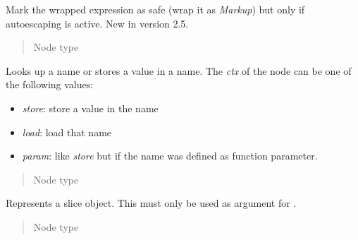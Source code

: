 \documentclass[a4paper,10pt,english]{sphinxmanual}
\begin{document}

\begin{fulllineitems}
\label{extensions:jinja2.nodes.MarkSafeIfAutoescape}
Mark the wrapped expression as safe (wrap it as \emph{Markup}) but
only if autoescaping is active.
New in version 2.5.\begin{quote}\begin{description}
\item[{Node type}] \leavevmode
{\hyperref[extensions:jinja2.nodes.Expr]{}}

\end{description}\end{quote}

\end{fulllineitems}


\begin{fulllineitems}
\label{extensions:jinja2.nodes.Name}
Looks up a name or stores a value in a name.
The \emph{ctx} of the node can be one of the following values:
\begin{itemize}
\item {} 
\emph{store}: store a value in the name

\item {} 
\emph{load}: load that name

\item {} 
\emph{param}: like \emph{store} but if the name was defined as function parameter.

\end{itemize}
\begin{quote}\begin{description}
\item[{Node type}] \leavevmode
{\hyperref[extensions:jinja2.nodes.Expr]{}}

\end{description}\end{quote}

\end{fulllineitems}


\begin{fulllineitems}
\label{extensions:jinja2.nodes.Slice}
Represents a slice object.  This must only be used as argument for
.
\begin{quote}\begin{description}
\item[{Node type}] \leavevmode
{\hyperref[extensions:jinja2.nodes.Expr]{}}

\end{description}\end{quote}

\end{fulllineitems}
\end{document}
